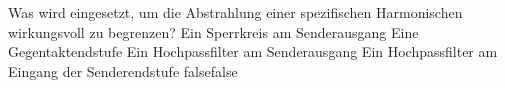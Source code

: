     {Was wird eingesetzt, um die Abstrahlung einer spezifischen Harmonischen wirkungsvoll zu begrenzen?}
    {Ein Sperrkreis am Senderausgang}
    {Eine Gegentaktendstufe}
    {Ein Hochpassfilter am Senderausgang}
    {Ein Hochpassfilter am Eingang der Senderendstufe}
    {false}{false}